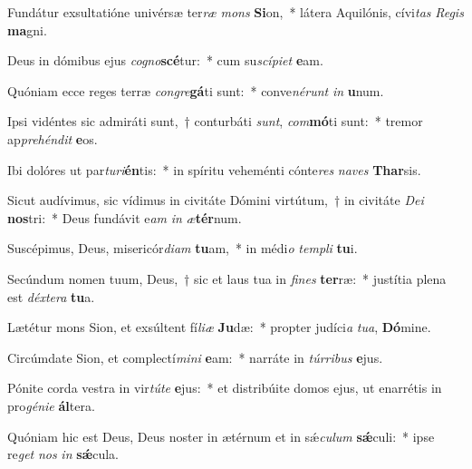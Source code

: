 \item Fundátur exsultatióne univérsæ ter\textit{ræ} \textit{mons} \textbf{Si}on,~* látera Aquilónis, cívi\textit{tas} \textit{Re}\textit{gis} \textbf{ma}gni.
\item Deus in dómibus ejus \textit{co}\textit{gno}\textbf{scé}tur:~* cum su\textit{scí}\textit{pi}\textit{et} \textbf{e}am.
\item Quóniam ecce reges terræ \textit{con}\textit{gre}\textbf{gá}ti sunt:~* conve\textit{né}\textit{runt} \textit{in} \textbf{u}num.
\item Ipsi vidéntes sic admiráti sunt,~† conturbáti \textit{sunt}, \textit{com}\textbf{mó}ti sunt:~* tremor ap\textit{pre}\textit{hén}\textit{dit} \textbf{e}os.
\item Ibi dolóres ut par\textit{tu}\textit{ri}\textbf{én}tis:~* in spíritu veheménti cónte\textit{res} \textit{na}\textit{ves} \textbf{Thar}sis.
\item Sicut audívimus, sic vídimus in civitáte Dómini virtútum,~† in civitáte \textit{De}\textit{i} \textbf{nos}tri:~* Deus fundávit e\textit{am} \textit{in} \textit{æ}\textbf{tér}num.
\item Suscépimus, Deus, misericór\textit{di}\textit{am} \textbf{tu}am,~* in médi\textit{o} \textit{tem}\textit{pli} \textbf{tu}i.
\item Secúndum nomen tuum, Deus,~† sic et laus tua in \textit{fi}\textit{nes} \textbf{ter}ræ:~* justítia plena est \textit{déx}\textit{te}\textit{ra} \textbf{tu}a.
\item Lætétur mons Sion, et exsúltent fí\textit{li}\textit{æ} \textbf{Ju}dæ:~* propter judíci\textit{a} \textit{tu}\textit{a}, \textbf{Dó}mine.
\item Circúmdate Sion, et complectí\textit{mi}\textit{ni} \textbf{e}am:~* narráte in \textit{túr}\textit{ri}\textit{bus} \textbf{e}jus.
\item Pónite corda vestra in vir\textit{tú}\textit{te} \textbf{e}jus:~* et distribúite domos ejus, ut enarrétis in pro\textit{gé}\textit{ni}\textit{e} \textbf{ál}tera.
\item Quóniam hic est Deus, Deus noster in ætérnum et in sǽ\textit{cu}\textit{lum} \textbf{sǽ}culi:~* ipse re\textit{get} \textit{nos} \textit{in} \textbf{sǽ}cula.
